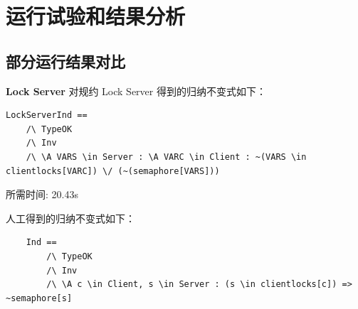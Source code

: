 \chapter{运行试验和结果分析}\label{chap:run-analysis}

\section{部分运行结果对比}
\textbf{Lock Server}
\rltla 对规约 Lock Server 得到的归纳不变式如下：
\begin{lstlisting}
LockServerInd == 
    /\ TypeOK 
    /\ Inv
    /\ \A VARS \in Server : \A VARC \in Client : ~(VARS \in clientlocks[VARC]) \/ (~(semaphore[VARS])) 
\end{lstlisting}
所需时间: 20.43s

人工得到的归纳不变式如下：
\begin{lstlisting}
    Ind == 
        /\ TypeOK
        /\ Inv
        /\ \A c \in Client, s \in Server : (s \in clientlocks[c]) => ~semaphore[s]
\end{lstlisting}


